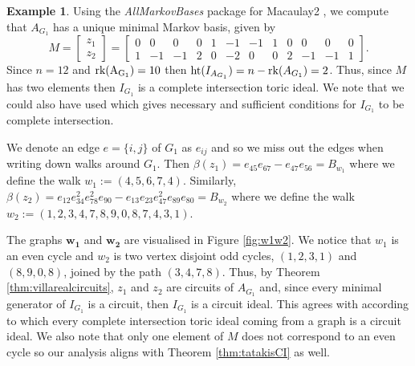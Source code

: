 \documentclass[a4paper, 12pt]{article}
\theoremstyle{plain}
\theoremstyle{definition}
\newtheorem{example}[theorem]{Example}
\theoremstyle{remark}
\begin{document}
\begin{example}
Using the \textit{AllMarkovBases} package \cite{CM_2025} for Macaulay2 \cite{M2}, we compute that $A_{G_1}$ has a unique minimal Markov basis, given by
$$M=\begin{bmatrix}z_1\\z_2\end{bmatrix}=\begin{bmatrix}
    0&0&0&0&1&-1&-1&1&0&0&0&0\\
    1&-1&-1&2&0&-2&0&0&2&-1&-1&1
\end{bmatrix}.$$
Since $n=12$ and ${\rm rk(A_{G_1})}=10$  then ${\rm ht}(I_{A_{G_1}})=n-{\rm rk}(A_{G_1})=2$. Thus, since $M$ has two elements then $I_{G_1}$ is a complete intersection toric ideal. We note that we could also have used \cite[Theorem 5.5]{tatakis2011completeintersectiontoricideals} which gives necessary and sufficient conditions for $I_{G_1}$ to be complete intersection.

We denote an edge $e=\{i,j\}$ of $G_1$ as $e_{ij}$ and so we miss out the edges when writing down walks around $G_1$. Then $\beta(z_1)=e_{45}e_{67}-e_{47}e_{56}=B_{w_1}$ where we define the walk $w_1:=(4,5,6,7,4)$. Similarly, $\beta(z_2)=e_{12}e_{34}^2e_{78}^2e_{90}-e_{13}e_{23}e_{47}^2e_{89}e_{80}=B_{w_2}$ where we define the walk $w_2:=(1,2,3,4,7,8,9,0,8,7,4,3,1)$.

The graphs $\mathbf{w_1}$ and $\mathbf{w_2}$ are visualised in Figure \ref{fig:w1w2}. We notice that $w_1$ is an even cycle and $w_2$ is two vertex disjoint odd cycles, $(1,2,3,1)$ and $(8,9,0,8)$, joined by the path $(3,4,7,8)$. Thus, by Theorem \ref{thm:villarealcircuits}, $z_1$ and $z_2$ are circuits of $A_{G_1}$ and, since every minimal generator of $I_{G_1}$ is a circuit, then $I_{G_1}$ is a circuit ideal. This agrees with \cite[Theorem 5.1]{tatakis2011completeintersectiontoricideals} according to which every complete intersection toric ideal coming from a graph is a circuit ideal. We also note that only one element of $M$ does not correspond to an even cycle so our analysis aligns with Theorem \ref{thm:tatakisCI} as well.


\end{example}
\end{document}
